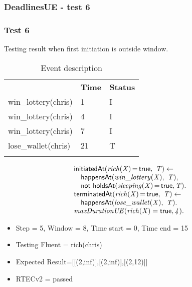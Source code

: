 \documentclass[8pt]{beamer}
\DeclareMathOperator{\val}{=}  %
\def \patsize {}
\def\happensAt{\textsf{\patsize happensAt}}
\def\holdsAt{\textsf{\patsize holdsAt}}
\def\initiatedAt{\textsf{\patsize initiatedAt}}
\def\terminatedAt{\textsf{\patsize terminatedAt}}
\def\nbf{\textsf{\patsize not}}
\def\true{\textsf{\patsize true}}
\newenvironment{mysplit}%
  {\arraycolsep 0pt \begin{array}{l}}%
  {\end{array}}
\begin{document}
\begin{frame}
    \frametitle{DeadlinesUE - test 6}
    \subsubsection{Test 6}
    \small
    Testing result when first initiation is outside window.\linebreak
    \begin{minipage}{0.48\linewidth}
        \begin{table}[t!]
            \caption{Event description}
            \begin{center}

                \begin{tabular}{lll}
                    \hline\noalign{\smallskip}
                    \multicolumn{1}{l}{\textbf{Event}} & \multicolumn{1}{c}{\textbf{Time}} & \multicolumn{1}{c}{\textbf{Status}} \\
                    win\_lottery(chris)& 1 & I\\
                    win\_lottery(chris)& 4 & I\\
                    win\_lottery(chris)& 7 & I\\
                    lose\_wallet(chris)& 21 & T\\
                    \noalign{\smallskip}
                    \hline
                \end{tabular}
            \end{center}
        \end{table}
    \end{minipage}
    \begin{minipage}{0.48\linewidth}
        \begin{align*}
            \begin{mysplit}
                \initiatedAt\mathit{(rich(X)\val\true,\ T) \leftarrow}\\
                \quad    \happensAt\mathit{(win\_lottery(X),\ T),}\\
                \quad    \nbf\ \holdsAt\mathit{(sleeping(X)\val\true,T)}.\\
                \terminatedAt\mathit{(rich(X)\val\true,\ T) \leftarrow}\\
                \quad    \happensAt\mathit{(lose\_wallet(X),\ T)}.\\
                \mathit{maxDurationUE(rich(X)=\true,4)}.\\
            \end{mysplit}
        \end{align*}
    \end{minipage}
    \begin{itemize}
        \item Step = 5, Window = 8, Time start = 0, Time end = 15
        \item Testing Fluent = rich(chris)
        \item Expected Result=[[(2,inf)],[(2,inf)],[(2,12)]]
        \item RTECv2 = passed
    \end{itemize}
\end{frame}
\end{document}
